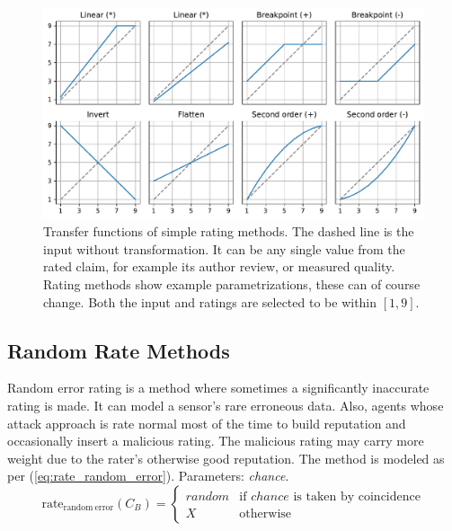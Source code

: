 \documentclass[%
    ]{\PathToTumTemplate/thesis/tum_thesis}
\begin{document}
\begin{figure}[tbp]
  \begin{center}
    \includegraphics[width=1\linewidth]{../images/simple_rate_strategies2.pdf}
    \caption{
    Transfer functions of simple rating methods.
    The dashed line is the input without transformation.
    It can be any single value from the rated claim, for example its author review, or measured quality.
    Rating methods show example parametrizations, these can of course change.
    Both the input and ratings are selected to be within $[1,9]$.
    }
    \label{fig:simple_rate_strategies}
  \end{center}
\end{figure}


\subsection{Random Rate Methods}
Random error rating is a method where sometimes a significantly inaccurate rating is made.
	It can model a sensor's rare erroneous data.
Also, agents whose attack approach is rate normal most of the time to build reputation and occasionally insert a malicious rating.
The malicious rating may carry more weight due to the rater's otherwise good reputation.
The method is modeled as per (\ref{eq:rate_random_error}).
Parameters: \emph{chance}.
\begin{equation}\label{eq:rate_random_error}
\mathrm{rate_{random~error}}(C_B) = 
\begin{cases}
random & \text{if $chance$ is taken by coincidence} \\
X & \text{otherwise}
\end{cases}
\end{equation}
\end{document}

